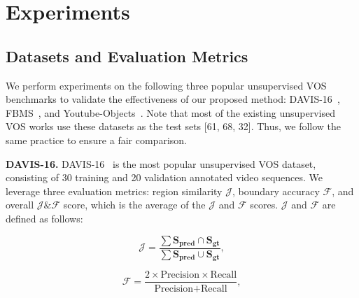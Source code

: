 \documentclass[10pt,twocolumn,letterpaper]{article}
\begin{document}
\section{Experiments}
\subsection{Datasets and Evaluation Metrics}
We perform experiments on the following three popular unsupervised VOS benchmarks to validate the effectiveness of our proposed method: DAVIS-16~\cite{perazzi2016benchmark}, FBMS~\cite{ochs2013segmentation}, and Youtube-Objects~\cite{prest2012learning}. Note that most of the existing unsupervised VOS works use these datasets as the test sets [61, 68, 32]. Thus, we follow the same practice to ensure a fair comparison.

\noindent
\textbf{DAVIS-16.} DAVIS-16~\cite{perazzi2016benchmark} is the most popular unsupervised VOS dataset, consisting of 30 training and 20 validation annotated video sequences. We leverage three evaluation metrics: region similarity $\mathcal{J}$, boundary accuracy $\mathcal{F}$, and overall $\mathcal{J}\&\mathcal{F}$ score, which is the average of the $\mathcal{J}$ and $\mathcal{F}$ scores. $\mathcal{J}$ and $\mathcal{F}$ are defined as follows:

\begin{equation}
	\mathcal{J} = \frac{\sum{\mathbf{S_{pred}} \cap \mathbf{S_{gt}}}}{\sum{\mathbf{S_{pred}} \cup \mathbf{S_{gt}}}},
\end{equation}

\begin{equation}
	\mathcal{F} = \frac{2 \times \textrm{Precision} \times \textrm{Recall}}{\textrm{Precision} + \textrm{Recall}},
\end{equation}
\end{document}
